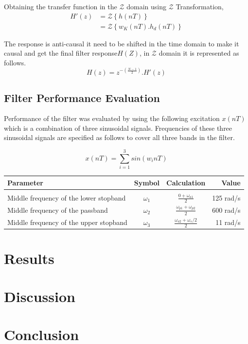 \documentclass[a4paper,11pt]{article}%
\begin{document}
Obtaining the transfer function in the $\mathcal{Z}$ domain using $\mathcal{Z}$ Transformation,
\begin{equation}
	\begin{split}
			H'(z) &= \mathcal{Z}\left\{ h(nT) \right\}\\
		&=\mathcal{Z}\left\{ w_K(nT).h_d(nT) \right\}
	\end{split}
\end{equation}

The response is anti-causal it need to be shifted in the time domain to make it causal and get the final filter response$H(Z)$, in $\mathcal{Z}$ domain it is represented as follows.
\begin{equation}
	H(z)= z^{-\left(\frac{N-1}{2}\right)}.H'(z)
\end{equation}

\subsection{Filter Performance Evaluation}

Performance of the filter was evaluated by using the following excitation $x(nT)$ which is a combination of three sinusoidal signals. Frequencies of these three sinusoidal signals are specified as follows to cover all three bands in the filter.

\[x(nT) = \sum_{i=1}^{3}sin(w_inT)\]

\begin{table}[!h]
	\centering
	\begin{tabular}{l c c r}
		\hline
	\textbf{Parameter}& \textbf{Symbol}& \textbf{Calculation}&\textbf{Value}\\\hline
	&&&\\
	Middle frequency of the lower stopband& $\omega_1$&$\frac{0+ \omega_{a1}}{2}$&125 rad/s\\
	Middle frequency of the passband &$\omega_2$&$\frac{\omega_{p1}+\omega_{p2}}{2}$&600 rad/s\\
	Middle frequency of the upper stopband& $\omega_3$&$\frac{\omega_{a2}+\omega_s/2}{2}$&11 rad/s\\
	\end{tabular}
\end{table}


\section{Results}
\section{Discussion}
\section{Conclusion}
%


\pagebreak



\end{document}
